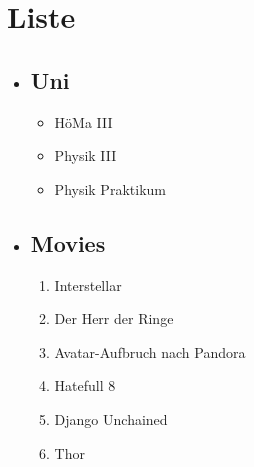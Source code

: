 \section{Liste}
\begin{itemize}
  \item \subsection{Uni}
  \begin{itemize}
    \item HöMa III
    \item Physik III
    \item Physik Praktikum
  \end{itemize}
  \item \subsection{Movies}
  \begin{enumerate}
    \item Interstellar
    \item Der Herr der Ringe
    \item Avatar-Aufbruch nach Pandora
    \item Hatefull 8
    \item Django Unchained
    \item Thor
  \end{enumerate}
\end{itemize}
